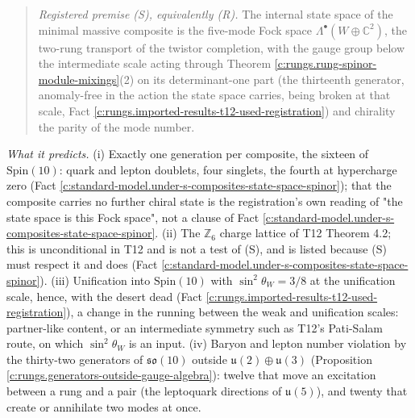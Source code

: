 \documentclass[11pt]{article}
\theoremstyle{definition}
\theoremstyle{plain}
\providecommand{\C}{}\renewcommand{\C}{\mathbb{C}}
\providecommand{\uu}{}\renewcommand{\uu}{\mathfrak{u}}
\begin{document}
\begin{quote}
\emph{Registered premise (S), equivalently (R).} The internal state space of the minimal massive composite is the five-mode Fock space $\Lambda^{\bullet}(W \oplus \C^{2})$, the two-rung transport of the twistor completion, with the gauge group below the intermediate scale acting through Theorem \ref{c:rungs.rung-spinor-module-mixings}(2) on its determinant-one part (the thirteenth generator, anomaly-free in the action the state space carries, being broken at that scale, Fact \ref{c:rungs.imported-results-t12-used-registration}) and chirality the parity of the mode number.
\end{quote}

\noindent\emph{What it predicts.} (i) Exactly one generation per composite, the sixteen of $\mathrm{Spin}(10)$: quark and lepton doublets, four singlets, the fourth at hypercharge zero (Fact \ref{c:standard-model.under-s-composites-state-space-spinor}); that the composite carries no further chiral state is the registration's own reading of "the state space is this Fock space", not a clause of Fact \ref{c:standard-model.under-s-composites-state-space-spinor}. (ii) The $\mathbb{Z}_{6}$ charge lattice of T12 Theorem 4.2; this is unconditional in T12 and is not a test of (S), and is listed because (S) must respect it and does (Fact \ref{c:standard-model.under-s-composites-state-space-spinor}). (iii) Unification into $\mathrm{Spin}(10)$ with $\sin^{2}\theta_{W} = 3/8$ at the unification scale, hence, with the desert dead (Fact \ref{c:rungs.imported-results-t12-used-registration}), a change in the running between the weak and unification scales: partner-like content, or an intermediate symmetry such as T12's Pati-Salam route, on which $\sin^{2}\theta_{W}$ is an input. (iv) Baryon and lepton number violation by the thirty-two generators of $\mathfrak{so}(10)$ outside $\uu(2) \oplus \uu(3)$ (Proposition \ref{c:rungs.generators-outside-gauge-algebra}): twelve that move an excitation between a rung and a pair (the leptoquark directions of $\uu(5)$), and twenty that create or annihilate two modes at once.
\end{document}
